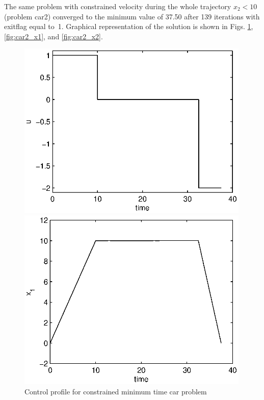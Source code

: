 The same problem with constrained velocity during the whole trajectory
$x_2 < 10$ (problem car2) converged to the minimum value of 37.50 after
139 iterations with exitflag equal to~1. Graphical representation of
the solution is shown in Figs. \ref{fig:car2_u},  \ref{fig:car2_x1}, and \ref{fig:car2_x2}.


\begin{figure}[htb]
\begin{minipage}[t]{0.32\linewidth}
\centering
\includegraphics[width=0.99\textwidth]{examples/problem-car2/car_u.eps}
\caption[Tutorial example constrained car: control profile]{Control profile for
  constrained minimum time car problem} \label{fig:car2_u} 
\end{minipage}
\begin{minipage}[t]{0.32\linewidth}
\centering
\includegraphics[width=0.99\textwidth]{examples/problem-car2/car_x1.eps}

\end{minipage}
\end{figure}
